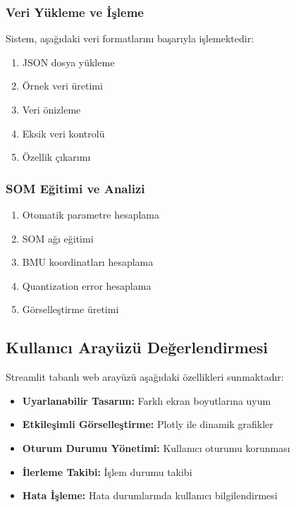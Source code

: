 \subsubsection{Veri Yükleme ve İşleme}

Sistem, aşağıdaki veri formatlarını başarıyla işlemektedir:

\begin{enumerate}
    \item JSON dosya yükleme
    \item Örnek veri üretimi
    \item Veri önizleme
    \item Eksik veri kontrolü
    \item Özellik çıkarımı
\end{enumerate}

\subsubsection{SOM Eğitimi ve Analizi}

\begin{enumerate}
    \item Otomatik parametre hesaplama
    \item SOM ağı eğitimi
    \item BMU koordinatları hesaplama
    \item Quantization error hesaplama
    \item Görselleştirme üretimi
\end{enumerate}

\subsection{Kullanıcı Arayüzü Değerlendirmesi}

Streamlit tabanlı web arayüzü aşağıdaki özellikleri sunmaktadır:

\begin{itemize}
    \item \textbf{Uyarlanabilir Tasarım:} Farklı ekran boyutlarına uyum
    \item \textbf{Etkileşimli Görselleştirme:} Plotly ile dinamik grafikler
    \item \textbf{Oturum Durumu Yönetimi:} Kullanıcı oturumu korunması
    \item \textbf{İlerleme Takibi:} İşlem durumu takibi
    \item \textbf{Hata İşleme:} Hata durumlarında kullanıcı bilgilendirmesi
\end{itemize}

